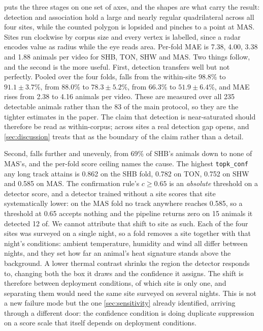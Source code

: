  puts the three stages on one set of axes, and the shapes are what carry the
result: detection and association hold a large and nearly regular quadrilateral across all
four sites, while the counted polygon is lopsided and pinches to a point at MAS. Sites run
clockwise by corpus size and every vertex is labelled, since a radar encodes value as radius
while the eye reads area. Per-fold MAE is 7.38, 4.00, 3.38 and 1.88 animals per video for SHB,
TON, SHW and MAS. Two things follow,
and the second is the more useful. First, detection transfers well but not
perfectly. Pooled over the four folds, \reachedq falls from the within-site 98.8\% to
$91.1 \pm 3.7\%$, \primaryq from 88.0\% to $78.3 \pm 5.2\%$, \countedq from 66.3\% to
$51.9 \pm 6.4\%$, and MAE rises from 2.38 to 4.16 animals per video. These are measured over all 235 detectable animals rather than the 83 of
the main protocol, so they are the tighter estimates in the paper. The claim that detection is
near-saturated should therefore be read as within-corpus; across sites a real detection gap
opens, and \cref{sec:discussion} treats that as the boundary of the claim rather than a
detail.

Second, \countedq falls further and unevenly, from 69\% of SHB's animals down to none of
MAS's, and the per-fold score ceiling names the cause. The highest \texttt{topk\_conf} any long
track attains is 0.862 on the SHB fold, 0.782 on TON, 0.752 on SHW and 0.585 on MAS. The confirmation rule's
$c\ge0.65$ is an \emph{absolute} threshold on a detector score, and a detector trained without
a site scores that site systematically lower: on the MAS fold no track anywhere reaches 0.585,
so a threshold at 0.65 accepts nothing and the pipeline returns zero on 15 animals it detected
12 of. We cannot attribute that shift to site as such. Each of the four sites was surveyed on
a single night, so a fold removes a site together with that night's conditions: ambient
temperature, humidity and wind all differ between nights, and they set how far an animal's
heat signature stands above the background. A lower thermal contrast shrinks the region the
detector responds to, changing both the box it draws and the confidence it assigns. The shift
is therefore between deployment conditions, of which site is only one, and separating them
would need the same site surveyed on several nights. This is not a new failure mode but the one \cref{sec:sensitivity} already identified,
arriving through a different door: the confidence condition is doing duplicate suppression on
a score scale that itself depends on deployment conditions.

